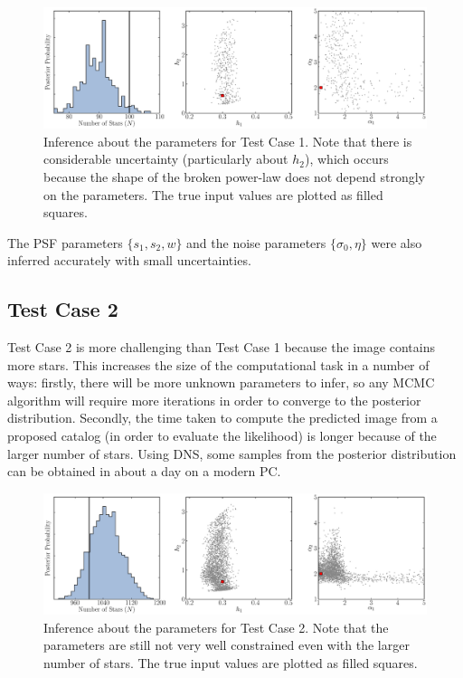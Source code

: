 \documentclass[12pt, preprint]{aastex}
\begin{document}
\begin{figure}[ht!]
\begin{center}
\includegraphics[width=\textwidth]{Figures/inference1.eps}
\end{center}
\caption{Inference about the parameters for Test Case 1. Note that there is
considerable uncertainty (particularly about $h_2$), which occurs because the
shape of the broken power-law does not depend strongly on the parameters.
The true input values are plotted as filled squares.
\label{fig:results1}}
\end{figure}

The PSF parameters $\{s_1, s_2, w\}$ and the noise parameters $\{\sigma_0, \eta\}$
were also inferred accurately with small uncertainties.

\subsection{Test Case 2}
Test Case 2 is more challenging than Test Case 1 because the image contains
more stars. This increases the size of the computational task in a number of
ways: firstly, there will be more unknown parameters to infer, so any MCMC
algorithm will require more iterations in order to converge to the posterior
distribution. Secondly, the time taken
to compute the predicted image from a proposed catalog (in order to evaluate the
likelihood) is longer because of the larger number of stars. Using DNS, some
samples from the posterior distribution can be obtained in about a day on a
modern PC.

\begin{figure}[ht!]
\begin{center}
\includegraphics[width=\textwidth]{Figures/inference2.eps}
\end{center}
\caption{Inference about the parameters for Test Case 2. Note that the
parameters are still not very well constrained even with the larger number of
stars. The true input values are plotted as filled squares.\label{fig:results2}}
\end{figure}
\end{document}
